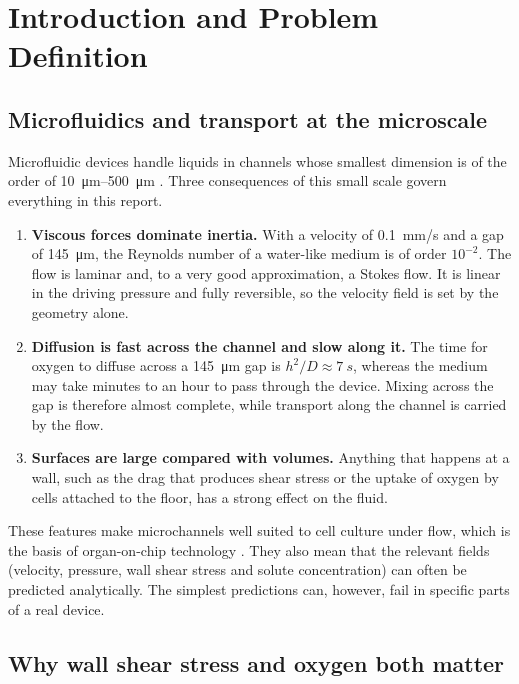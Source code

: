 \chapter{Introduction and Problem Definition}
\label{ch:intro}

\section{Microfluidics and transport at the microscale}

Microfluidic devices handle liquids in channels whose smallest dimension is of the order of \SIrange{10}{500}{\micro\metre} \citep{Whitesides2006,Squires2005}. Three consequences of this small scale govern everything in this report.
\begin{enumerate}
\item \textbf{Viscous forces dominate inertia.} With a velocity of \SI{0.1}{mm/s} and a gap of \SI{145}{\micro\metre}, the Reynolds number of a water-like medium is of order $10^{-2}$. The flow is laminar and, to a very good approximation, a Stokes flow. It is linear in the driving pressure and fully reversible, so the velocity field is set by the geometry alone.
\item \textbf{Diffusion is fast across the channel and slow along it.} The time for oxygen to diffuse across a \SI{145}{\micro\metre} gap is $h^2/D\approx\SI{7}{s}$, whereas the medium may take minutes to an hour to pass through the device. Mixing across the gap is therefore almost complete, while transport along the channel is carried by the flow.
\item \textbf{Surfaces are large compared with volumes.} Anything that happens at a wall, such as the drag that produces shear stress or the uptake of oxygen by cells attached to the floor, has a strong effect on the fluid.
\end{enumerate}

These features make microchannels well suited to cell culture under flow, which is the basis of organ-on-chip technology \citep{BhatiaIngber2014,Zhang2018,Kim2012}. They also mean that the relevant fields (velocity, pressure, wall shear stress and solute concentration) can often be predicted analytically. The simplest predictions can, however, fail in specific parts of a real device.

\section{Why wall shear stress and oxygen both matter}


